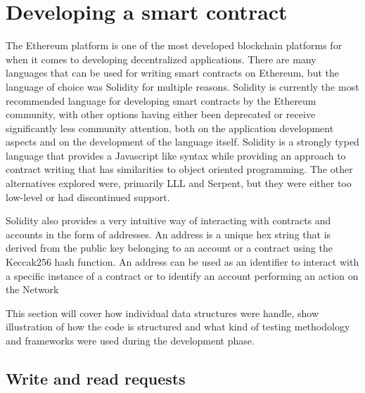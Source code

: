 \documentclass[12pt]{article}
\begin{document}



\section{Developing a smart contract}
The Ethereum platform is one of the most developed blockchain platforms for when it comes to developing decentralized applications. There are many languages that can be used for writing smart contracts on Ethereum, but the language of choice was Solidity for multiple reasons. Solidity is currently the most recommended language for developing smart contracts by the Ethereum community, with other options having either been deprecated or receive significantly less community attention, both on the application development aspects and on the development of the language itself.
Solidity is a strongly typed language that provides a Javascript like syntax while providing an approach to contract writing that has similarities to object oriented programming. The other alternatives explored were, primarily LLL and Serpent, but they were either too low-level or had discontinued support.

Solidity also provides a very intuitive way of interacting with contracts and accounts in the form of addresses. An address is a unique hex string that is derived from the public key belonging to an account or a contract using the Keccak256 hash function. An address can be used as an identifier to interact with a specific instance of a contract or to identify an account performing an action on the Network

This section will cover how individual data structures were handle, show illustration of how the code is structured and what kind of testing methodology and frameworks were used during the development phase.
\subsection{Write and read requests}
\end{document}
